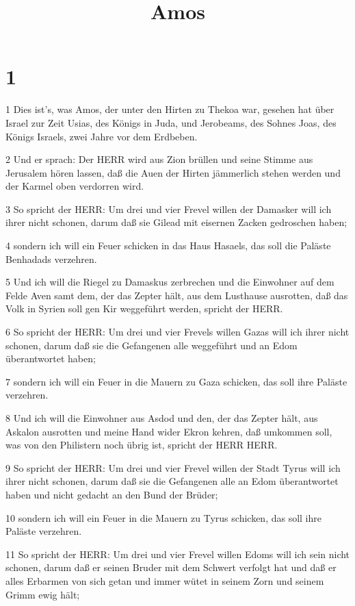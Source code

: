 

\title{Amos}


\chapter{1}

\par 1 Dies ist's, was Amos, der unter den Hirten zu Thekoa war, gesehen hat über Israel zur Zeit Usias, des Königs in Juda, und Jerobeams, des Sohnes Joas, des Königs Israels, zwei Jahre vor dem Erdbeben.
\par 2 Und er sprach: Der HERR wird aus Zion brüllen und seine Stimme aus Jerusalem hören lassen, daß die Auen der Hirten jämmerlich stehen werden und der Karmel oben verdorren wird.
\par 3 So spricht der HERR: Um drei und vier Frevel willen der Damasker will ich ihrer nicht schonen, darum daß sie Gilead mit eisernen Zacken gedroschen haben;
\par 4 sondern ich will ein Feuer schicken in das Haus Hasaels, das soll die Paläste Benhadads verzehren.
\par 5 Und ich will die Riegel zu Damaskus zerbrechen und die Einwohner auf dem Felde Aven samt dem, der das Zepter hält, aus dem Lusthause ausrotten, daß das Volk in Syrien soll gen Kir weggeführt werden, spricht der HERR.
\par 6 So spricht der HERR: Um drei und vier Frevels willen Gazas will ich ihrer nicht schonen, darum daß sie die Gefangenen alle weggeführt und an Edom überantwortet haben;
\par 7 sondern ich will ein Feuer in die Mauern zu Gaza schicken, das soll ihre Paläste verzehren.
\par 8 Und ich will die Einwohner aus Asdod und den, der das Zepter hält, aus Askalon ausrotten und meine Hand wider Ekron kehren, daß umkommen soll, was von den Philistern noch übrig ist, spricht der HERR HERR.
\par 9 So spricht der HERR: Um drei und vier Frevel willen der Stadt Tyrus will ich ihrer nicht schonen, darum daß sie die Gefangenen alle an Edom überantwortet haben und nicht gedacht an den Bund der Brüder;
\par 10 sondern ich will ein Feuer in die Mauern zu Tyrus schicken, das soll ihre Paläste verzehren.
\par 11 So spricht der HERR: Um drei und vier Frevel willen Edoms will ich sein nicht schonen, darum daß er seinen Bruder mit dem Schwert verfolgt hat und daß er alles Erbarmen von sich getan und immer wütet in seinem Zorn und seinem Grimm ewig hält;
